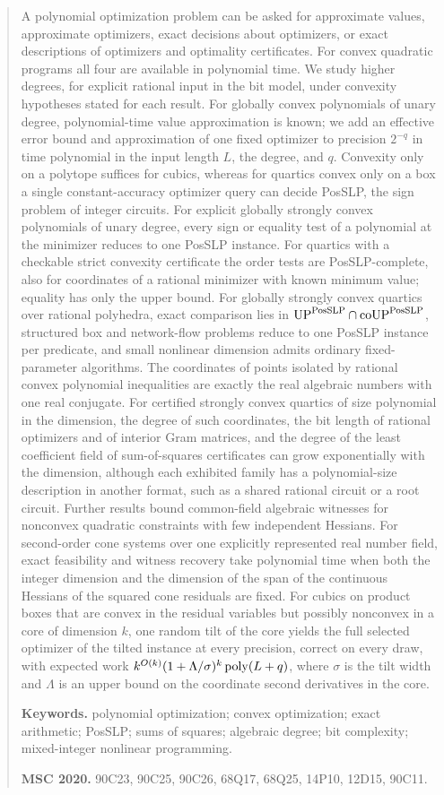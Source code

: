 \begin{abstract}
A polynomial optimization problem can be asked for approximate values,
approximate optimizers, exact decisions about optimizers, or exact
descriptions of optimizers and optimality certificates. For convex quadratic
programs all four are available in polynomial time. We study higher degrees,
for explicit rational input in the bit model, under convexity hypotheses
stated for each result. For globally convex polynomials of unary degree,
polynomial-time value approximation is known; we add an effective error bound
and approximation of one fixed optimizer to precision $2^{-q}$ in time
polynomial in the input length $L$, the degree, and $q$. Convexity only on a
polytope suffices for cubics, whereas for quartics convex only on a box a
single constant-accuracy optimizer query can decide PosSLP, the sign problem
of integer circuits. For explicit globally strongly convex polynomials of
unary degree, every sign or equality test of a polynomial at the minimizer
reduces to one PosSLP instance. For quartics with a checkable strict
convexity certificate the order tests are PosSLP-complete, also for
coordinates of a rational minimizer with known minimum value; equality has
only the upper bound. For globally strongly convex quartics over rational
polyhedra, exact comparison lies in
$\mathrm{UP}^{\PosSLP}\cap\mathrm{coUP}^{\PosSLP}$, structured box and
network-flow problems reduce to one PosSLP instance per predicate, and small
nonlinear dimension admits ordinary fixed-parameter algorithms. The
coordinates of points isolated by rational convex polynomial inequalities are
exactly the real algebraic numbers with one real conjugate. For certified
strongly convex quartics of size polynomial in the dimension, the degree of
such coordinates, the bit length of rational optimizers and of interior Gram
matrices, and the degree of the least coefficient field of sum-of-squares
certificates can grow exponentially with the dimension, although each
exhibited family has a polynomial-size description in another format, such as
a shared rational circuit or a root circuit. Further results bound
common-field algebraic witnesses for nonconvex quadratic constraints with few
independent Hessians. For second-order cone systems over one explicitly
represented real number field, exact feasibility and witness recovery take
polynomial time when both the integer dimension and the dimension of the
span of the continuous Hessians of the squared cone residuals are fixed.
For cubics on product boxes that are convex in the residual
variables but possibly nonconvex in a core of dimension $k$, one random tilt
of the core yields the full selected optimizer of the tilted instance at
every precision, correct on every draw, with
expected work $k^{O(k)}(1+\Lambda/\sigma)^k\poly(L+q)$, where $\sigma$ is the
tilt width and $\Lambda$ is an upper bound on the coordinate second
derivatives in the core.

\medskip
\noindent\textbf{Keywords.} polynomial optimization; convex optimization;
exact arithmetic; PosSLP; sums of squares; algebraic degree; bit complexity;
mixed-integer nonlinear programming.

\noindent\textbf{MSC 2020.} 90C23, 90C25, 90C26, 68Q17, 68Q25, 14P10, 12D15,
90C11.
\end{abstract}
